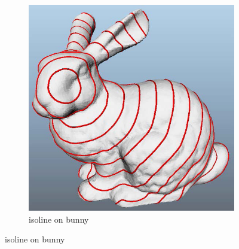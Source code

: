 \begin{figure}[H]
\begin{subfigure}[b]{0.5\textwidth}
                \includegraphics[width=\textwidth]{../images/geodesic_image/bunny_isoline}
                \caption{isoline on bunny}
                \label{fig:bunny_iso}
        \end{subfigure}
        

\end{figure}
